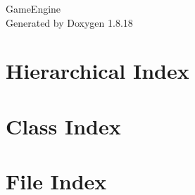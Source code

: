 \let\mypdfximage\pdfximage\def\pdfximage{\immediate\mypdfximage}\documentclass[twoside]{book}
\newcommand{\+}{\discretionary{\mbox{\scriptsize$\hookleftarrow$}}{}{}}
\newcommand{\clearemptydoublepage}{%
  \newpage{\pagestyle{empty}\cleardoublepage}%
}
\begin{document}
\hypersetup{pageanchor=false,
             bookmarksnumbered=true,
             pdfencoding=unicode
            }
\begin{titlepage}
\vspace*{7cm}
\begin{center}%
{\Large Game\+Engine }\\
\vspace*{1cm}
{\large Generated by Doxygen 1.8.18}\\
\end{center}
\end{titlepage}
\clearemptydoublepage
{}
\tableofcontents
\clearemptydoublepage
{}
\hypersetup{pageanchor=true}

\chapter{Hierarchical Index}

\chapter{Class Index}

\chapter{File Index}

\end{document}
